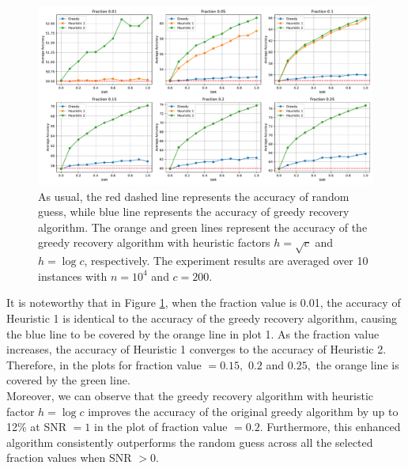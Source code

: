 \begin{figure}[H]
    \centering
    \includegraphics[width=1\linewidth]{Figures/heu_super_dense.pdf}
    \caption[Comparison of Greedy Recovery Algorithm and Heuristic Strategy with 2 Different Factors for $k=2$.]{As usual, the red dashed line represents the accuracy of random guess, while blue line represents the accuracy of greedy recovery algorithm. The orange and green lines represent the accuracy of the greedy recovery algorithm with heuristic factors $h=\sqrt{c}$ and $h=\log{c}$, respectively. The experiment results are averaged over 10 instances with $n=10^4$ and $c=200.$}
    \label{fig: heuristic greedy}
\end{figure}
It is noteworthy that in Figure \ref{fig: heuristic greedy}, when the fraction value is 0.01, the accuracy of Heuristic 1 is identical to the accuracy of the greedy recovery algorithm, causing the blue line to be covered by the orange line in plot 1. As the fraction value increases, the accuracy of Heuristic 1 converges to the accuracy of Heuristic 2.  Therefore, in the plots for fraction value $=0.15,$ $0.2$ and $0.25,$ the orange line is covered by the green line.\\
Moreover, we can observe that the greedy recovery algorithm with heuristic factor $h=\log{c}$ improves the accuracy of the original greedy algorithm by up to 12\% at SNR $=1$ in the plot of fraction value $=0.2.$ Furthermore, this enhanced algorithm consistently outperforms the random guess across all the selected fraction values when SNR $>0$.



